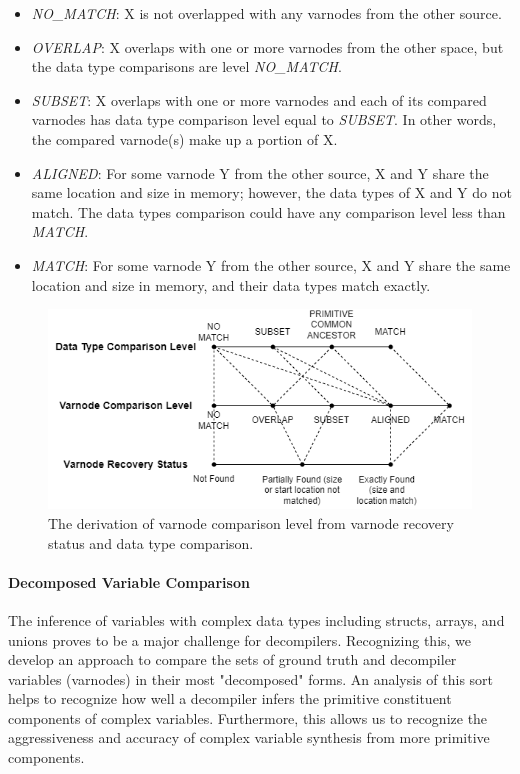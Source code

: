 \documentclass[a4paper,twoside]{article}
\begin{document}
\begin{itemize}
    \item \emph{NO\_MATCH}: X is not overlapped with any varnodes from the other source.
    \item \emph{OVERLAP}: X overlaps with one or more varnodes from the other space, but the data type comparisons are level \emph{NO\_MATCH}.
    \item \emph{SUBSET}: X overlaps with one or more varnodes and each of its compared varnodes has data type comparison level equal to \emph{SUBSET}. In other words, the compared varnode(s) make up a portion of X.
    \item \emph{ALIGNED}: For some varnode Y from the other source, X and Y share the same location and size in memory; however, the data types of X and Y do not match. The data types comparison could have any comparison level less than \emph{MATCH}.
    \item \emph{MATCH}: For some varnode Y from the other source, X and Y share the same location and size in memory, and their data types match exactly.
\end{itemize}

\begin{figure}[htb]
    \centering
    \includegraphics[width=\columnwidth]{./figures/varnode-levels.drawio.png}
    \caption{The derivation of varnode comparison level from varnode recovery status and data type comparison.}
    \label{fig:varnode-levels}
\end{figure}

\paragraph{Decomposed Variable Comparison}

The inference of variables with complex data types including structs, arrays, and unions proves to be a major challenge for decompilers. Recognizing this, we develop an approach to compare the sets of ground truth and decompiler variables (varnodes) in their most "decomposed" forms. An analysis of this sort helps to recognize how well a decompiler infers the primitive constituent components of complex variables. Furthermore, this allows us to recognize the aggressiveness and accuracy of complex variable synthesis from more primitive components.
\end{document}
